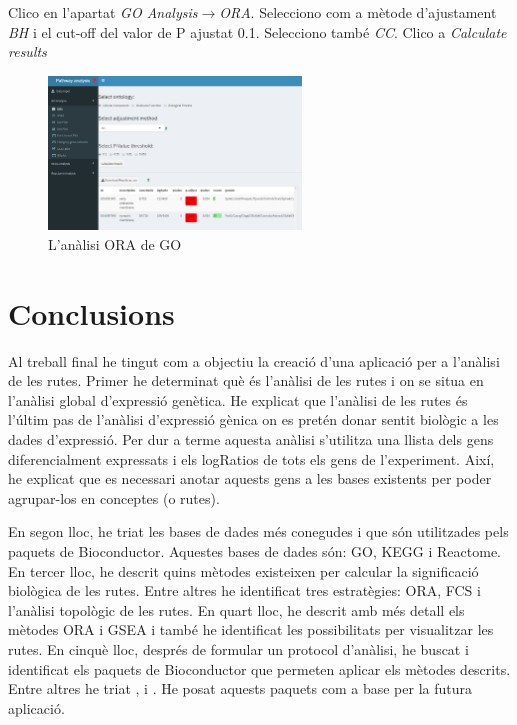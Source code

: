 Clico en l'apartat \textit{\gls{GO} Analysis}$\rightarrow$\textit{ORA}. Selecciono com a mètode d'ajustament \textit{BH} i el cut-off del valor de P ajustat 0.1. Selecciono també \textit{CC}. Clico a \textit{Calculate results}
\begin{figure}[H]
\centering
\includegraphics[width=0.6\textwidth]{figures/Estudi1_Fig13_GO.png} 
\caption{L'anàlisi \gls{ORA} de \gls{GO}}
\end{figure}

\chapter{Conclusions}

Al treball final he tingut com a objectiu la creació d'una aplicació per a l’anàlisi de les rutes. Primer he determinat què és l'anàlisi de les rutes i on se situa en l'anàlisi global d'expressió genètica. He explicat que l'anàlisi de les rutes és l'últim pas de l'anàlisi d'expressió gènica on es pretén donar sentit biològic a les dades d'expressió. Per dur a terme aquesta anàlisi s'utilitza una llista dels gens diferencialment expressats i els \gls{logRatio}s de tots els gens de l'experiment. Així, he explicat que es necessari anotar aquests gens a les bases existents per poder agrupar-los en conceptes (o rutes). 

En segon lloc, he triat les bases de dades més conegudes i que són utilitzades pels paquets de \gls{Bioconductor}. Aquestes bases de dades són: \gls{GO}, \gls{KEGG} i Reactome. En tercer lloc, he descrit quins mètodes existeixen per calcular la significació biològica de les rutes. Entre altres he identificat tres estratègies: \gls{ORA}, \gls{FCS} i l'anàlisi topològic de les rutes. En quart lloc, he descrit amb més detall els mètodes \gls{ORA} i \gls{GSEA} i també he identificat les possibilitats per visualitzar les rutes. En cinquè lloc, després de formular un protocol d'anàlisi, he buscat i identificat els paquets de \gls{Bioconductor} que permeten aplicar els mètodes descrits. Entre altres he triat ,  i . He posat aquests paquets com a base per la futura aplicació. 

